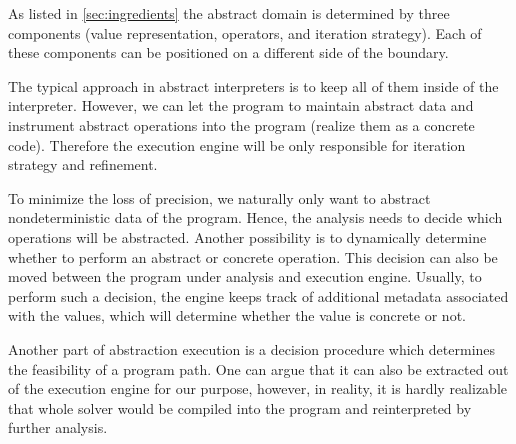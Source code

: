 As listed in \autoref{sec:ingredients} the abstract domain is determined by
three components (value representation, operators, and iteration strategy).
Each of these components can be positioned on a different side of the boundary.

The typical approach in abstract interpreters is to keep all of them inside of
the interpreter. However, we can let the program to maintain abstract data and
instrument abstract operations into the program (realize them as a concrete
code). Therefore the execution engine will be only responsible for iteration
strategy and refinement.

To minimize the loss of precision, we naturally only want to abstract
nondeterministic data of the program. Hence, the analysis needs to decide which
operations will be abstracted. Another possibility is to dynamically determine
whether to perform an abstract or concrete operation. This decision can also be
moved between the program under analysis and execution engine. Usually, to
perform such a decision, the engine keeps track of additional metadata
associated with the values, which will determine whether the value is concrete
or not.

Another part of abstraction execution is a decision procedure which determines
the feasibility of a program path. One can argue that it can also be extracted
out of the execution engine for our purpose, however, in reality, it is hardly
realizable that whole \smt solver would be compiled into the program and
reinterpreted by further analysis.

